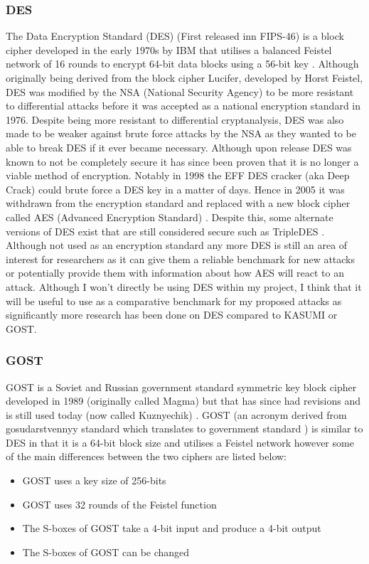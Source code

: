 \documentclass{article}
\begin{document}
\subsubsection{DES}
The Data Encryption Standard (DES) (First released inn FIPS-46) is a block cipher developed in the early 1970s by IBM that utilises a balanced Feistel network of 16 rounds to encrypt 64-bit data blocks using a 56-bit key \cite{wiki:Data_Encryption_Standard}. Although originally being derived from the block cipher Lucifer, developed by Horst Feistel, DES was modified by the NSA (National Security Agency) to be more resistant to differential attacks before it was accepted as a national encryption standard in 1976. Despite being more resistant to differential cryptanalysis, DES was also made to be weaker against brute force attacks by the NSA as they wanted to be able to break DES if it ever became necessary. Although upon release DES was known to not be completely secure it has since been proven that it is no longer a viable method of encryption. Notably in 1998 the EFF DES cracker (aka Deep Crack) \cite{wiki:EFF_DES_cracker} could brute force a DES key in a matter of days. Hence in 2005 it was withdrawn from the encryption standard and replaced with a new block cipher called AES (Advanced Encryption Standard) \cite{wiki:Advanced_Encryption_Standard}. Despite this, some alternate versions of DES exist that are still considered secure such as TripleDES \cite{wiki:Triple_DES}. Although not used as an encryption standard any more DES is still an area of interest for researchers as it can give them a reliable benchmark for new attacks or potentially provide them with information about how AES will react to an attack. Although I won't directly be using DES within my project, I think that it will be useful to use as a comparative benchmark for my proposed attacks as significantly more research has been done on DES compared to KASUMI or GOST.
\subsubsection{GOST}
GOST is a Soviet and Russian government standard symmetric key block cipher developed in 1989 (originally called Magma) \cite{wiki:GOST_(block_cipher)} but that has since had revisions and is still used today (now called Kuznyechik) \cite{wiki:Kuznyechik}. GOST (an acronym derived from gosudarstvennyy standard which translates to government standard \cite{wiki:GOST}) is similar to DES in that it is a 64-bit block size and utilises a Feistel network however some of the main differences between the two ciphers are listed below:
\begin{itemize}
    \item GOST uses a key size of 256-bits
    \item GOST uses 32 rounds of the Feistel function
    \item The S-boxes of GOST take a 4-bit input and produce a 4-bit output
    \item The S-boxes of GOST can be changed
\end{itemize}
\end{document}
